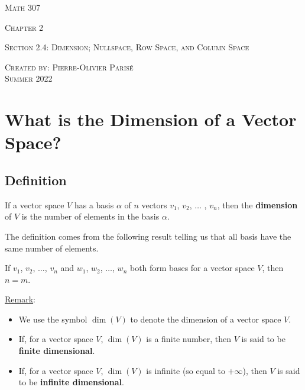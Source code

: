 \documentclass[12pt,a4paper]{article}
\begin{document}
\thispagestyle{empty}

\begin{center}
\vspace*{2.5cm}

{\Huge \textsc{Math 307}}

\vspace*{2cm}

{\LARGE \textsc{Chapter 2}} 

\vspace*{0.75cm}

\noindent\textsc{Section 2.4: Dimension; Nullspace, Row Space, and Column Space}

\vspace*{0.75cm}

\tableofcontents

\vfill

\noindent \textsc{Created by: Pierre-Olivier Paris{\'e}} \\
\textsc{Summer 2022}
\end{center}

\newpage

\section{What is the Dimension of a Vector Space?}

	\subsection{Definition}
	If a vector space $V$ has a basis $\alpha$ of $n$ vectors $v_1$, $v_2$, $\ldots$ , $v_n$, then the \textbf{dimension} of $V$ is the number of elements in the basis $\alpha$. 
	
	\vspace*{8pt}
	
	The definition comes from the following result telling us that all basis have the same number of elements.
	
	\vspace*{16pt}
	
	\begin{theorem}
	If $v_1$, $v_2$, $\ldots$, $v_n$ and $w_1$, $w_2$, $\ldots$, $w_n$ both form bases for a vector space $V$, then $n = m$.
	\end{theorem}
	
	\noindent\underline{Remark}:
		\begin{itemize}
		\item We use the symbol $\dim (V)$ to denote the dimension of a vector space $V$. 
		\item If, for a vector space $V$, $\dim (V)$ is a finite number, then $V$ is said to be \textbf{finite dimensional}.
		\item If, for a vector space $V$, $\dim (V)$ is infinite (so equal to $+\infty$), then $V$ is said to be \textbf{infinite dimensional}.
		\end{itemize}
		
\end{document}
